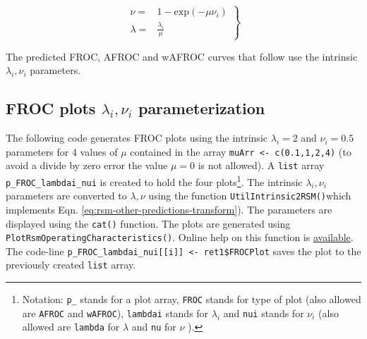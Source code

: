 \documentclass[
]{book}
\begin{document}
\begin{equation}
\left. 
\begin{aligned}
\nu =& 1 - \text{exp}\left ( - \mu \nu_i \right ) \\
\lambda =& \frac{\lambda_i}{\mu}
\end{aligned}
\right \}
\label{eq:rsm-other-predictions-transform}
\end{equation}

The predicted FROC, AFROC and wAFROC curves that follow use the intrinsic \(\lambda_i, \nu_i\) parameters.

\hypertarget{froc-plots-lambda_i-nu_i-parameterization}{%
\subsection{\texorpdfstring{FROC plots \(\lambda_i, \nu_i\) parameterization}{FROC plots \textbackslash lambda\_i, \textbackslash nu\_i parameterization}}\label{froc-plots-lambda_i-nu_i-parameterization}}

The following code generates FROC plots using the intrinsic \(\lambda_i = 2\) and \(\nu_i = 0.5\) parameters for 4 values of \(\mu\) contained in the array \texttt{muArr\ \textless{}-\ c(0.1,1,2,4)} (to avoid a divide by zero error the value \(\mu=0\) is not allowed). A \texttt{list} array \texttt{p\_FROC\_lambdai\_nui} is created to hold the four plots\footnote{Notation: \texttt{p\_} stands for a plot array, \texttt{FROC} stands for type of plot (also allowed are \texttt{AFROC} and \texttt{wAFROC}), \texttt{lambdai} stands for \(\lambda_i\) and \texttt{nui} stands for \(\nu_i\) (also allowed are \texttt{lambda} for \(\lambda\) and \texttt{nu} for \(\nu\) ).}. The intrinsic \(\lambda_i, \nu_i\) parameters are converted to \(\lambda, \nu\) using the function \texttt{UtilIntrinsic2RSM()}which implements Eqn. \eqref{eq:rsm-other-predictions-transform}). The parameters are displayed using the \texttt{cat()} function. The plots are generated using \texttt{PlotRsmOperatingCharacteristics()}. Online help on this function is \href{https://dpc10ster.github.io/RJafroc/reference/PlotRsmOperatingCharacteristics.html}{available}. The code-line \texttt{p\_FROC\_lambdai\_nui{[}{[}i{]}{]}\ \textless{}-\ ret1\$FROCPlot} saves the plot to the previously created \texttt{list} array.
\end{document}

